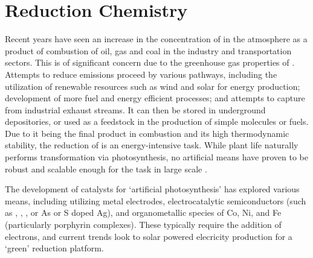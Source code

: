 \section{ Reduction Chemistry}

Recent years have seen an increase in the concentration of  in the atmosphere as a product of combustion of oil, gas and coal in the industry and transportation sectors\autocite{song2006}. This is of significant concern due to the greenhouse gas properties of  \autocite{matthews2009, meinshausen2009}. Attempts to reduce emissions proceed by various pathways, including the utilization of renewable resources such as wind and solar for energy production\autocite{neuhoff2005}; development of more fuel and energy efficient processes; and attempts to capture  from industrial exhaust streams\autocite{peratitus2014, kadantsev2013, iremonger2011}. It can then be stored in underground depositories, or used as a feedstock in the production of simple molecules or fuels\autocite{leitner1996, olah2009, kang2012}. Due to it being the final product in combustion and its high thermodynamic stability, the reduction of  is an energy-intensive task\autocite{schwarz1989, morris2009}. While plant life naturally performs  transformation via photosynthesis, no artificial means have proven to be robust and scalable enough for the task in large scale \autocite{arakawa2001}. 

The development of catalysts for `artificial photosynthesis' has explored various means, including utilizing metal electrodes\autocite{li2010}, electrocatalytic semiconductors (such as , , , or As or S doped Ag)\autocite{inoue1971, lim2014}, and organometallic species of Co, Ni, and Fe (particularly porphyrin complexes)\autocite{fisher1980, tinnemans1984, beley1986, simonmanso2004, fujita1994, fujita1993, kimura1994, dhanasekaran1999, lacy2014}. These typically require the addition of electrons, and current trends look to solar powered elecricity production for a `green'  reduction platform\autocite{zeng2014}.

